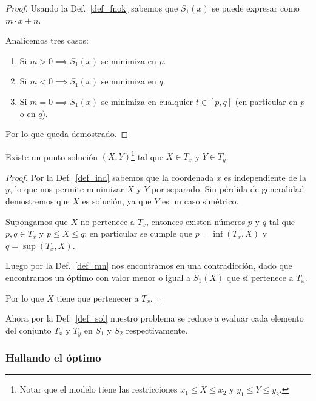 \begin{proof}
    Usando la Def.~\ref{def_fnok} sabemos que $S_1(x)$ se puede expresar como $m \cdot x + n$.

    Analicemos tres casos:

    \begin{enumerate}
        \item Si $m > 0 \implies S_1(x)$ se minimiza en $p$.
        \item Si $m < 0 \implies S_1(x)$ se minimiza en $q$.
        \item Si $m = 0 \implies S_1(x)$ se minimiza en cualquier $t \in [p, q]$ (en particular en $p$ o en $q$).
    \end{enumerate}

    Por lo que queda demostrado.
\end{proof}

\newpage
\begin{definition}
    Existe un punto solución $(X, Y)$\footnote{Notar que el modelo tiene las restricciones $x_1 \le X \le x_2$ y $y_1 \le Y \le y_2$.} tal que $X \in T_x$ y $Y \in T_y$.
    \label{def_sol}
\end{definition}

\begin{proof}
    \hfill

    Por la Def.~\ref{def_ind} sabemos que la coordenada $x$ es independiente de la $y$, lo que nos permite minimizar $X$ y $Y$ por separado. Sin pérdida de generalidad demostremos que $X$ es solución, ya que $Y$ es un caso simétrico.
    
    Supongamos que $X$ no pertenece a $T_x$, entonces existen números $p$ y $q$ tal que $p, q \in T_x$ y $p \le X \le q$; en particular se cumple que $p = \inf(T_x, X)$ y $q = \sup(T_x, X)$.
    
    Luego por la Def.~\ref{def_mn} nos encontramos en una contradicción, dado que encontramos un óptimo con valor menor o igual a $S_1(X)$ que sí pertenece a $T_x$.
    
    Por lo que $X$ tiene que pertenecer a $T_x$.
\end{proof}

Ahora por la Def.~\ref{def_sol} nuestro problema se reduce a evaluar cada elemento del conjunto $T_x$ y $T_y$ en $S_1$ y $S_2$ respectivamente.

\subsubsection{Hallando el óptimo}


